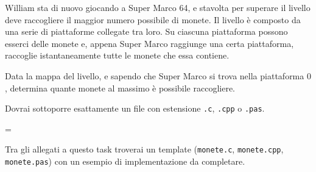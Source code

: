 \usepackage{xcolor}
\usepackage{afterpage}
\usepackage{pifont,mdframed}
\usepackage[bottom]{footmisc}

\makeatletter
\gdef\this@inputfilename{input.txt}
\gdef\this@outputfilename{output.txt}
\makeatother

\newcommand{\inputfile}{\texttt{input.txt}}
\newcommand{\outputfile}{\texttt{output.txt}}

\newenvironment{warning}
  {\par\begin{mdframed}[linewidth=2pt,linecolor=gray]%
    \begin{list}{}{\leftmargin=1cm
                   \labelwidth=\leftmargin}\item[\Large\ding{43}]}
  {\end{list}\end{mdframed}\par}

William sta di nuovo giocando a Super Marco 64, e stavolta per superare il livello deve raccogliere il maggior numero possibile di monete. Il livello è composto da una serie di piattaforme collegate tra loro. Su ciascuna piattaforma possono esserci delle monete e, appena Super Marco raggiunge una certa piattaforma, raccoglie istantaneamente tutte le monete che essa contiene.

Data la mappa del livello, e sapendo che Super Marco si trova nella piattaforma $0$, determina quante monete al massimo è possibile raccogliere.

\Implementation
Dovrai sottoporre esattamente un file con estensione \texttt{.c}, \texttt{.cpp} o \texttt{.pas}.

\begin{warning}
Tra gli allegati a questo task troverai un template (\texttt{monete.c}, \texttt{monete.cpp}, \texttt{monete.pas}) con un esempio di implementazione da completare.
\end{warning}

